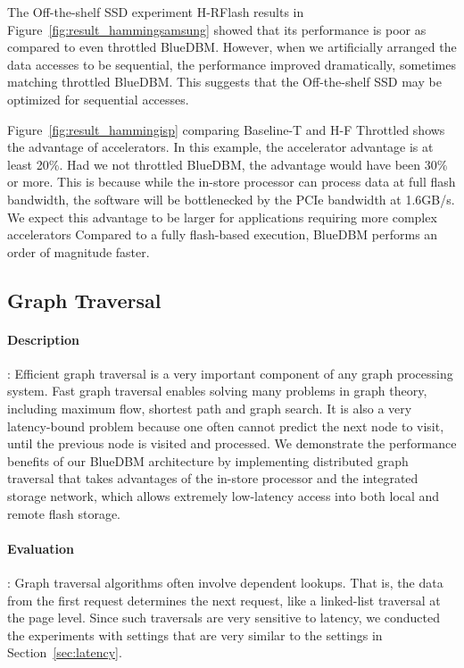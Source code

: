 The Off-the-shelf SSD experiment H-RFlash results in
Figure~\ref{fig:result_hammingsamsung} showed that its performance is poor as
compared to even throttled BlueDBM. However, when we artificially arranged the
data accesses to be sequential, the performance improved dramatically, sometimes
matching throttled BlueDBM. This suggests that the Off-the-shelf SSD may be optimized for sequential accesses.

Figure~\ref{fig:result_hammingisp} comparing Baseline-T and H-F Throttled shows the advantage of accelerators. In this example, the accelerator advantage is at least 20\%. Had we not throttled BlueDBM, the advantage would have been 30\% or more. This is because while the in-store processor can process data at full flash bandwidth, the software will be bottlenecked by the PCIe bandwidth at 1.6GB/s. We expect this advantage to be larger for applications requiring more complex accelerators
Compared to a fully flash-based execution, BlueDBM performs an order
of magnitude faster.

\subsection{Graph Traversal}

\paragraph{Description} :
Efficient graph traversal is a very important component of any graph processing
system. Fast graph traversal enables solving many problems in graph theory,
including maximum flow, shortest path and graph search. It is also a very
latency-bound problem because one often cannot predict the next node to visit,
until the previous node is visited and processed. We demonstrate the performance
benefits of our BlueDBM architecture by implementing distributed graph
traversal that takes advantages of the in-store processor and the integrated
storage network, which allows extremely low-latency access into both local and
remote flash storage.  

\paragraph{Evaluation} :
Graph traversal algorithms often involve dependent lookups. That is, the data from the first request determines the next request, like a linked-list traversal at the page level. Since such traversals are very sensitive to latency, we conducted the experiments with settings that are very similar to the settings in Section~\ref{sec:latency}.

